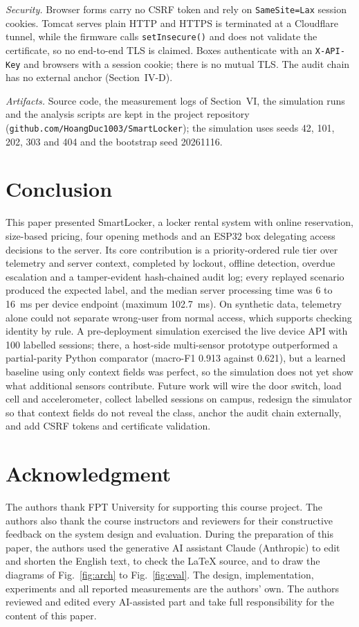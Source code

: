 \documentclass[journal,onecolumn]{IEEEtran}
\begin{document}
\textit{Security.} Browser forms carry no CSRF token and rely on \texttt{SameSite=Lax} session cookies. Tomcat serves
plain HTTP and HTTPS is terminated at a Cloudflare tunnel, while the firmware calls \texttt{setInsecure()} and does not
validate the certificate, so no end-to-end TLS is claimed. Boxes authenticate with an \texttt{X-API-Key} and browsers
with a session cookie; there is no mutual TLS. The audit chain has no external anchor (Section~IV-D).

\textit{Artifacts.} Source code, the measurement logs of Section~VI, the simulation runs and the analysis scripts are
kept in the project repository (\texttt{github.com/HoangDuc1003/SmartLocker}); the simulation uses seeds 42, 101, 202,
303 and 404 and the bootstrap seed 20261116.

\section{Conclusion}

This paper presented SmartLocker, a locker rental system with online reservation, size-based pricing, four opening
methods and an ESP32 box delegating access decisions to the server. Its core contribution is a priority-ordered rule
tier over telemetry and server context, completed by lockout, offline detection, overdue escalation and a tamper-evident
hash-chained audit log; every replayed scenario produced the expected label, and the median server processing time was
6 to 16~ms per device endpoint (maximum 102.7~ms). On synthetic data, telemetry alone could not separate wrong-user from
normal access, which supports checking identity by rule. A pre-deployment simulation exercised the live device API with
100 labelled sessions; there, a host-side multi-sensor prototype outperformed a partial-parity Python comparator
(macro-F1 0.913 against 0.621), but a learned baseline using only context fields was perfect, so the simulation does
not yet show what additional sensors contribute. Future work will wire the door switch, load cell and accelerometer,
collect labelled sessions on campus, redesign the simulator so that context fields do not reveal the class, anchor the
audit chain externally, and add CSRF tokens and certificate validation.

\section*{Acknowledgment}

The authors thank FPT University for supporting this course project. The authors also thank the course instructors and
reviewers for their constructive feedback on the system design and evaluation. During the preparation of this paper,
the authors used the generative AI assistant Claude (Anthropic) to edit and shorten the English text, to check the
\LaTeX{} source, and to draw the diagrams of Fig.~\ref{fig:arch} to Fig.~\ref{fig:eval}. The design, implementation,
experiments and all reported measurements are the authors' own. The authors reviewed and edited every AI-assisted part
and take full responsibility for the content of this paper.
\end{document}
